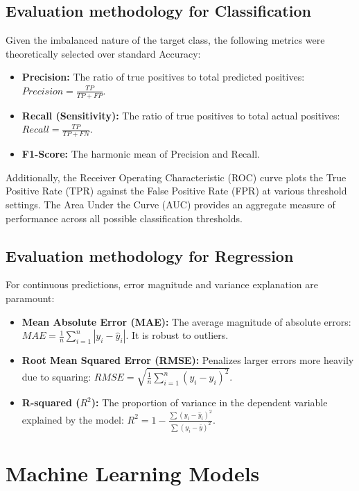 \documentclass[12pt,a4paper]{article}
\begin{document}
\subsection{Evaluation methodology for Classification}
Given the imbalanced nature of the target class, the following metrics were theoretically selected over standard Accuracy:
\begin{itemize}
    \item \textbf{Precision:} The ratio of true positives to total predicted positives: $Precision = \frac{TP}{TP + FP}$.
    \item \textbf{Recall (Sensitivity):} The ratio of true positives to total actual positives: $Recall = \frac{TP}{TP + FN}$.
    \item \textbf{F1-Score:} The harmonic mean of Precision and Recall.
\end{itemize}
Additionally, the Receiver Operating Characteristic (ROC) curve plots the True Positive Rate (TPR) against the False Positive Rate (FPR) at various threshold settings. The Area Under the Curve (AUC) provides an aggregate measure of performance across all possible classification thresholds.

\subsection{Evaluation methodology for Regression}
For continuous predictions, error magnitude and variance explanation are paramount:
\begin{itemize}
    \item \textbf{Mean Absolute Error (MAE):} The average magnitude of absolute errors: $MAE = \frac{1}{n}\sum_{i=1}^{n}|y_i - \hat{y}_i|$. It is robust to outliers.
    \item \textbf{Root Mean Squared Error (RMSE):} Penalizes larger errors more heavily due to squaring: $RMSE = \sqrt{\frac{1}{n}\sum_{i=1}^{n}(y_i - \hat{y}_i)^2}$.
    \item \textbf{R-squared ($R^2$):} The proportion of variance in the dependent variable explained by the model: $R^2 = 1 - \frac{\sum (y_i - \hat{y}_i)^2}{\sum (y_i - \bar{y})^2}$.
\end{itemize}

\section{Machine Learning Models}
\end{document}

